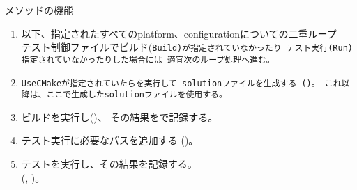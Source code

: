 \begin{Description}{メソッドの機能}
\begin{enumerate}
\begin{enumerate}
	  \item	以下、指定されたすべてのplatform、configurationについての二重ループ\\
		テスト制御ファイルでビルド(\tt{Build})が指定されていなかったり
		テスト実行(\tt{Run})指定されていなかったりした場合には
		適宜次のループ処理へ進む。

	  \item	\tt{UseCMake}が指定されていたらを実行して
		solutionファイルを生成する
		()。
		これ以降は、ここで生成したsolutionファイルを使用する。

	  \item	ビルドを実行し()、
		その結果をで記録する。

	  \item	テスト実行に必要なパスを追加する ()。

	  \item	テストを実行し、その結果を記録する。\\
		(, )。
	\end{enumerate}
\end{enumerate}
\end{Description}

